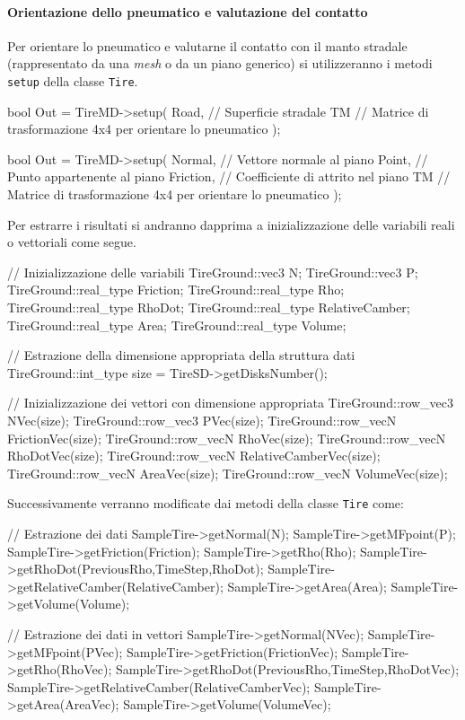 \paragraph{Orientazione dello pneumatico e valutazione del contatto}
Per orientare lo pneumatico e valutarne il contatto con il manto stradale (rappresentato da una \textit{mesh} o da un piano generico) si utilizzeranno i metodi \texttt{setup} della classe \texttt{Tire}.
\begin{pseudoc}
bool Out = TireMD->setup(
	Road, // Superficie stradale
	TM    // Matrice di trasformazione 4x4 per orientare lo pneumatico
	);
\end{pseudoc}
\begin{pseudoc}
bool Out = TireMD->setup(
	Normal,   // Vettore normale al piano
	Point,    // Punto appartenente al piano
	Friction, // Coefficiente di attrito nel piano
	TM        // Matrice di trasformazione 4x4 per orientare lo pneumatico
	);
\end{pseudoc}
Per estrarre i risultati si andranno dapprima a inizializzazione delle variabili reali o vettoriali come segue.
\begin{pseudoc}
	// Inizializzazione delle variabili
	TireGround::vec3 N;
	TireGround::vec3 P;
	TireGround::real_type Friction;
	TireGround::real_type Rho;
	TireGround::real_type RhoDot;
	TireGround::real_type RelativeCamber;
	TireGround::real_type Area;
	TireGround::real_type Volume;
	
	// Estrazione della dimensione appropriata della struttura dati
	TireGround::int_type size = TireSD->getDisksNumber();
	
	// Inizializzazione dei vettori con dimensione appropriata
	TireGround::row_vec3 NVec(size);
	TireGround::row_vec3 PVec(size);
	TireGround::row_vecN FrictionVec(size);
	TireGround::row_vecN RhoVec(size);
	TireGround::row_vecN RhoDotVec(size);
	TireGround::row_vecN RelativeCamberVec(size);
	TireGround::row_vecN AreaVec(size);
	TireGround::row_vecN VolumeVec(size);
\end{pseudoc}
Successivamente verranno modificate dai metodi della classe \texttt{Tire} come:
\begin{pseudoc}
	// Estrazione dei dati
	SampleTire->getNormal(N);
	SampleTire->getMFpoint(P);
	SampleTire->getFriction(Friction);
	SampleTire->getRho(Rho);
	SampleTire->getRhoDot(PreviousRho,TimeStep,RhoDot);
	SampleTire->getRelativeCamber(RelativeCamber);
	SampleTire->getArea(Area);
	SampleTire->getVolume(Volume);
	
	// Estrazione dei dati in vettori
	SampleTire->getNormal(NVec);
	SampleTire->getMFpoint(PVec);
	SampleTire->getFriction(FrictionVec);
	SampleTire->getRho(RhoVec);
	SampleTire->getRhoDot(PreviousRho,TimeStep,RhoDotVec);
	SampleTire->getRelativeCamber(RelativeCamberVec);
	SampleTire->getArea(AreaVec);
	SampleTire->getVolume(VolumeVec);
\end{pseudoc}
%

